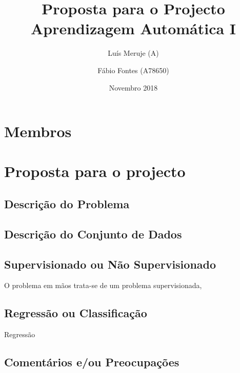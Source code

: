 \documentclass[a4paper]{article}
\title{
    Proposta para o Projecto \\
    Aprendizagem Automática I
    }
\author{
    Luís Meruje (A) \and
    Fábio Fontes (A78650)
}
\date{Novembro 2018}
\begin{document}

\maketitle


\clearpage
\section*{Membros}
\label{sec:membros}


\clearpage
\section*{Proposta para o projecto}
\label{sec:proposta}



\subsection*{Descrição do Problema}
\label{subsec:descricao_problema}



\subsection*{Descrição do Conjunto de Dados}
\label{subsec:descricao_conjunto}


\subsection*{Supervisionado ou Não Supervisionado}
\label{subsec:sup_nsup}

O problema em mãos trata-se de um problema supervisionada, 


\subsection*{Regressão ou Classificação}
\label{subsec:regre_class}

Regressão


\subsection*{Comentários e/ou Preocupações}
\label{subsec:comentarios}



\end{document}
